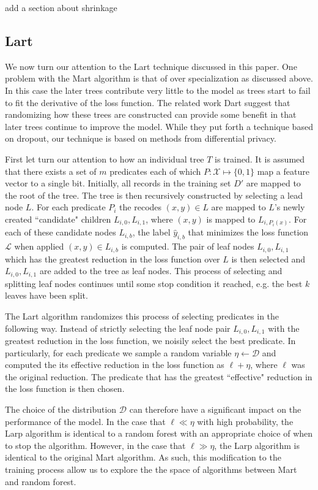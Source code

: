 \documentclass{article} %
\begin{document}
{\color{red} add a section about shrinkage}


\subsection{Lart}
We now turn our attention to the Lart technique discussed in this paper. One problem with the Mart algorithm is that of over specialization as discussed above\cite{dart}. In this case the later trees contribute very little to the  model as trees start to fail to fit the derivative of the loss function. The related work Dart \cite{dart} suggest that randomizing how these trees are constructed can provide some benefit in that later trees continue to improve the model. While they put forth a technique based on dropout, our technique is based on methods from differential privacy.


First let turn our attention to how an individual tree $T$ is trained. It is assumed that there exists a set of $m$ predicates each of which $P:\mathcal{X} \mapsto \{0,1\}$ map a feature vector to a single bit.  Initially, all records in the training set $D'$ are mapped to the root of the tree. The tree is then recursively constructed by selecting a lead node $L$. For each predicate $P_i$ the recodes $(x,y)\in L$ are mapped to $L$'s newly created ``candidate" children $L_{i,0},L_{i,1}$, where $(x,y)$ is mapped to $L_{i,P_i(x)}$. For each of these candidate nodes $L_{i,b}$, the label $\hat{y}_{i,b}$ that minimizes the loss function $\mathcal{L}$ when applied $(x,y)\in L_{i,b}$ is computed. The pair of leaf nodes $L_{i,0}, L_{i,1}$ which has the greatest reduction in the loss function over $L$ is then selected and $L_{i,0}, L_{i,1}$ are added to the tree as leaf nodes. This process of selecting and splitting leaf nodes continues until some stop condition it reached, e.g. the best $k$ leaves have been split.

The Lart algorithm randomizes this process of selecting predicates in the following way. Instead of strictly selecting the leaf node pair $L_{i,0}, L_{i,1}$ with the greatest reduction in the loss function, we noisily select the best predicate. In particularly, for each predicate we sample a random variable $\eta\gets \mathcal{D}$ and computed the its effective reduction in the loss function as $\ell + \eta$, where $\ell$ was the original reduction. The predicate that has the greatest ``effective" reduction in the loss function is then chosen.

The choice of the distribution $\mathcal{D}$ can therefore have a significant impact on the performance of the model. In the case that $\ell \ll \eta$ with high probability,  the Larp algorithm is identical to a random forest with an appropriate choice of when to stop the algorithm. However, in the case that $\ell \gg \eta$, the Larp algorithm is identical to the original Mart algorithm. As such, this modification to the training process allow us to explore the the space of algorithms between Mart and random forest.
\end{document}
